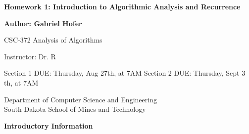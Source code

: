 \documentclass[10pt, a4paper]{article}
\begin{document}
\begin{titlepage}
   \begin{center}
       \vspace*{1cm}
       \large
       \textbf{Homework 1: Introduction to Algorithmic Analysis and Recurrence}
       \normalsize

       \vspace{0.5cm}

       \textbf{Author: Gabriel Hofer}

       \vspace{0.5cm}

       CSC-372 Analysis of Algorithms

       \vspace{0.5cm}

       Instructor: Dr. R

       \vspace{0.5cm}

       Section 1 DUE: Thursday, Aug 27th, at 7AM  \newline
       Section 2 DUE: Thursday, Sept 3 th, at 7AM  

       \vfill

       Department of Computer Science and Engineering\\
       South Dakota School of Mines and Technology\\

   \end{center}
\end{titlepage}
\newpage
\textbf{Introductory Information}
\end{document}
